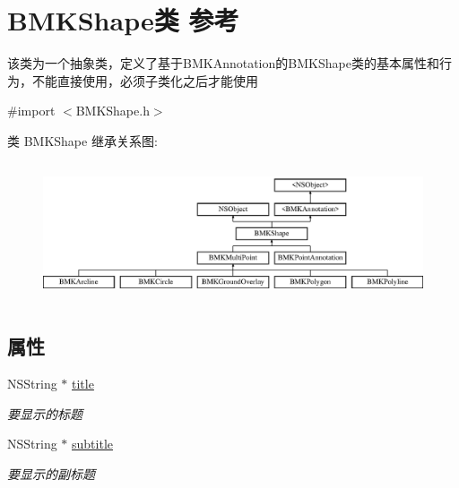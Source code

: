 \hypertarget{interface_b_m_k_shape}{}\section{B\+M\+K\+Shape类 参考}
\label{interface_b_m_k_shape}


该类为一个抽象类，定义了基于\+B\+M\+K\+Annotation的\+B\+M\+K\+Shape类的基本属性和行为，不能直接使用，必须子类化之后才能使用  




{\ttfamily \#import $<$B\+M\+K\+Shape.\+h$>$}

类 B\+M\+K\+Shape 继承关系图\+:\begin{figure}[H]
\begin{center}
\leavevmode
\includegraphics[height=4.148148cm]{interface_b_m_k_shape}
\end{center}
\end{figure}
\subsection*{属性}
\begin{DoxyCompactItemize}
\item 
\hypertarget{interface_b_m_k_shape_a64da6d2885114c0c2da35aa1ffec925d}{}N\+S\+String $\ast$ \hyperlink{interface_b_m_k_shape_a64da6d2885114c0c2da35aa1ffec925d}{title}\label{interface_b_m_k_shape_a64da6d2885114c0c2da35aa1ffec925d}

\begin{DoxyCompactList}\small\item\em 要显示的标题 \end{DoxyCompactList}\item 
\hypertarget{interface_b_m_k_shape_ae588ba39a27b52bcaed14d40e6494398}{}N\+S\+String $\ast$ \hyperlink{interface_b_m_k_shape_ae588ba39a27b52bcaed14d40e6494398}{subtitle}\label{interface_b_m_k_shape_ae588ba39a27b52bcaed14d40e6494398}

\begin{DoxyCompactList}\small\item\em 要显示的副标题 \end{DoxyCompactList}\end{DoxyCompactItemize}
